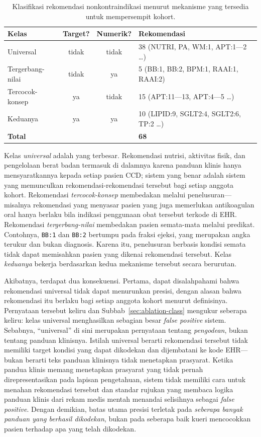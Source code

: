 \begin{table}[h]
\centering
\caption{Klasifikasi rekomendasi nonkontraindikasi menurut mekanisme yang tersedia untuk
mempersempit kohort.}
\label{tab:disc-class}
\begin{tabular}{lccl}
\hline
\textbf{Kelas} & \textbf{Target?} & \textbf{Numerik?} & \textbf{Rekomendasi} \\
\hline
Universal        & tidak & tidak & 38 \quad (NUTRI, PA, WM:1, APT:1---2 \ldots) \\
Tergerbang-nilai & tidak & ya    & \phantom{0}5 \quad (BB:1, BB:2, BPM:1, RAAI:1, RAAI:2) \\
Tercocok-konsep  & ya    & tidak & 15 \quad (APT:11---13, APT:4---5 \ldots) \\
Keduanya         & ya    & ya    & 10 \quad (LIPID:9, SGLT2:4, SGLT2:6, TP:2 \ldots) \\
\hline
\textbf{Total}   &       &       & \textbf{68} \\
\hline
\end{tabular}
\end{table}

Kelas \emph{universal} adalah yang terbesar. Rekomendasi nutrisi, aktivitas fisik, dan
pengelolaan berat badan termasuk di dalamnya karena panduan klinis hanya mensyaratkannya kepada setiap pasien
CCD; sistem yang benar adalah sistem yang memunculkan rekomendasi-rekomendasi tersebut bagi setiap anggota kohort. Rekomendasi
\emph{tercocok-konsep} membedakan melalui penelusuran---misalnya rekomendasi yang menyasar
pasien yang juga memerlukan antikoagulan oral hanya berlaku bila indikasi penggunaan obat tersebut terkode di EHR.
Rekomendasi \emph{tergerbang-nilai} membedakan pasien semata-mata melalui predikat.
Contohnya, \texttt{BB:1} dan \texttt{BB:2} bertumpu pada fraksi ejeksi, yang merupakan angka
terukur dan bukan diagnosis. Karena itu, penelusuran berbasis kondisi semata tidak dapat
memisahkan pasien yang dikenai rekomendasi tersebut. Kelas \emph{keduanya} bekerja
berdasarkan kedua mekanisme tersebut secara berurutan.

Akibatnya, terdapat dua konsekuensi. Pertama, dapat disalahpahami
bahwa rekomendasi universal tidak dapat menurunkan presisi, dengan alasan
bahwa rekomendasi itu berlaku bagi setiap anggota kohort menurut definisinya. Pernyataan tersebut
keliru dan Subbab~\ref{sec:ablation-class} mengukur seberapa keliru: kelas universal
menghasilkan sebagian besar \emph{false positive} sistem. Sebabnya, ``universal'' di sini
merupakan pernyataan tentang \emph{pengodean}, bukan tentang panduan klinisnya. Istilah universal berarti
rekomendasi tersebut tidak memiliki target kondisi yang dapat dikodekan dan dijembatani
ke kode EHR---bukan berarti teks panduan klinisnya tidak menetapkan prasyarat. Ketika pandua klinis memang
menetapkan prasyarat yang tidak pernah direpresentasikan pada lapisan pengetahuan, sistem
tidak memiliki cara untuk menahan rekomendasi tersebut dan standar rujukan yang membaca
logika panduan klinis dari rekam medis mentah menandai selisihnya sebagai \emph{false positive}.
Dengan demikian, batas utama presisi terletak pada \emph{seberapa banyak panduan yang berhasil
dikodekan}, bukan pada seberapa baik kueri mencocokkan pasien terhadap apa yang telah
dikodekan.

